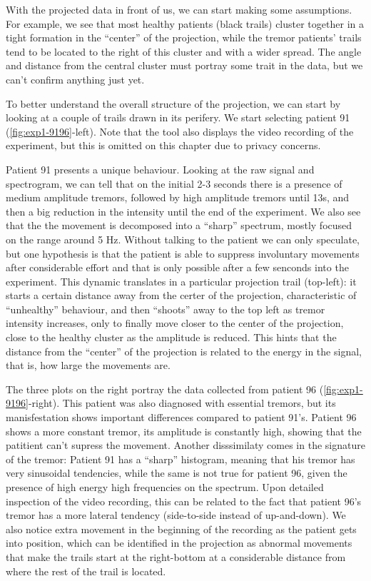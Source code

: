 With the projected data in front of us, we can start making some assumptions. For example, we see that most healthy patients (black trails) cluster together in a tight formation in the ``center'' of the projection, while the tremor patients' trails tend to be located to the right of this cluster and with a wider spread. The angle and distance from the central cluster must portray some trait in the data, but we can't confirm anything just yet.    

To better understand the overall structure of the projection, we can start by looking at a couple of trails drawn in its perifery. We start selecting patient 91 (\cref{fig:exp1-9196}-left). Note that the tool also displays the video recording of the experiment, but this is omitted on this chapter due to privacy concerns. 

Patient 91 presents a unique behaviour. Looking at the raw signal and spectrogram, we can tell that on the initial 2-3 seconds there is a presence of medium amplitude tremors, followed by high amplitude tremors until 13s, and then a big reduction in the intensity until the end of the experiment. We also see that the the movement is decomposed into a ``sharp'' spectrum, mostly focused on the range around 5 Hz. Without talking to the patient we can only speculate, but one hypothesis is that the patient is able to suppress involuntary movements after considerable effort and that is only possible after a few senconds into the experiment. This dynamic translates in a particular  projection trail (top-left): it starts a certain distance away from the certer of the projection, characteristic of ``unhealthy'' behaviour, and then ``shoots'' away to the top left as tremor intensity increases, only to finally move closer to the center of the projection, close to the healthy cluster as the amplitude is reduced. This hints that the distance from the ``center'' of the projection is related to the energy in the signal, that is, how large the movements are. 

The three plots on the right portray the data collected from patient 96 (\cref{fig:exp1-9196}-right). This patient was also diagnosed with essential tremors, but its manisfestation shows important differences compared to patient 91's. Patient 96 shows a more constant tremor, its amplitude is constantly high, showing that the patitient can't supress the movement. Another disssimilaty comes in the signature of the tremor: Patient 91 has a ``sharp'' histogram, meaning that his tremor has very sinusoidal tendencies, while the same is not true for patient 96, given the presence of high energy high frequencies on the spectrum. Upon detailed inspection of the video recording, this can be related to the fact that patient 96's tremor has a more lateral tendency (side-to-side instead of up-and-down).  We also notice extra movement in the beginning of the recording as the patient gets into position, which can be identified in the projection as abnormal movements that make the trails start at the right-bottom at a considerable distance from where the rest of the trail is located.   

